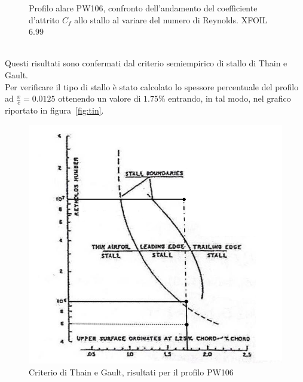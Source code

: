 \begin{figure} [H]
\centering
{}
\caption{\footnotesize Profilo alare PW106, confronto dell'andamento del coefficiente d'attrito $C_f$ allo stallo al variare del numero di Reynolds. XFOIL 6.99}
\label{fig:coef}
\end{figure}
 \noindent \\ 


Questi risultati sono confermati dal criterio semiempirico di stallo di Thain e Gault.\\
 Per verificare il tipo di stallo è stato calcolato lo spessore percentuale del profilo ad ${\frac {x}{c} }=0.0125$ ottenendo un valore di $1.75 \%$ entrando, in tal modo, nel grafico riportato in figura~\vref{fig:tin}.



\begin {figure} [H]
\centering
\includegraphics[width= 12cm ]{images/fileImg/thin.png}
\caption{\footnotesize Criterio di Thain e Gault, risultati per il profilo PW106}
\label {fig:tin}
\end {figure}
